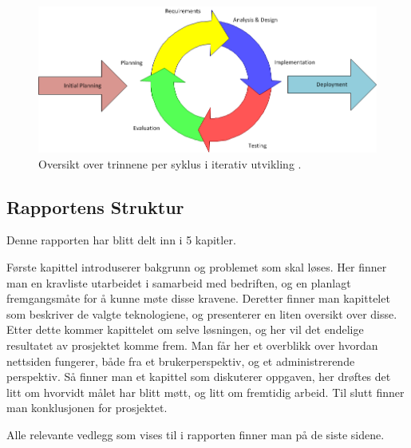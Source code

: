  \begin{figure}[htbp]
	\centering
		\includegraphics[scale=0.5]{Bilder/iterativ_utvikling.png}
	\caption[Iterativ Utviklings Diagram]{Oversikt over trinnene per syklus i iterativ utvikling \cite{iterative:development}. } %
	\label{fig:iterative_development}
\end{figure}



\subsection{Rapportens Struktur}
Denne rapporten har blitt delt inn i 5 kapitler.

Første kapittel introduserer bakgrunn og problemet som skal løses. Her finner man en kravliste utarbeidet i samarbeid med bedriften, og en planlagt fremgangsmåte for å kunne møte disse kravene. Deretter finner man kapittelet som beskriver de valgte teknologiene, og presenterer en liten oversikt over disse. Etter dette kommer kapittelet om selve løsningen, og her vil det endelige resultatet av prosjektet komme frem. Man får her et overblikk over hvordan nettsiden fungerer, både fra et brukerperspektiv, og et administrerende perspektiv. Så finner man et kapittel som diskuterer oppgaven, her drøftes det litt om hvorvidt målet har blitt møtt, og litt om fremtidig arbeid. Til slutt finner man konklusjonen for prosjektet.

Alle relevante vedlegg som vises til i rapporten finner man på de siste sidene.





\newpage